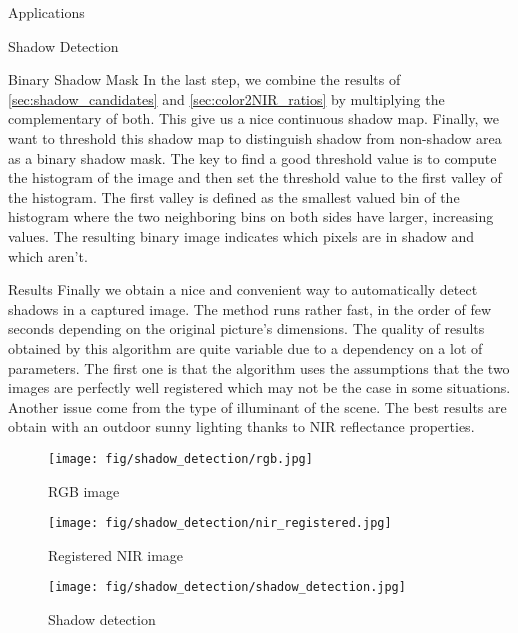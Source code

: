 \documentclass[11pt]{article}
\begin{document}
\begin{section}{Applications}
\begin{subsection}{Shadow Detection}
        \begin{subsubsection}{Binary Shadow Mask}
            \label{sec:binary_shadow_mask}
            In the last step, we combine the results of \ref{sec:shadow_candidates} and \ref{sec:color2NIR_ratios} by multiplying the complementary of both. This give us a nice continuous shadow map. Finally, we want to threshold this shadow map to distinguish shadow from non-shadow area as a binary shadow mask. The key to find a good threshold value is to compute the histogram of the image and then set the threshold value to the first valley of the histogram. The first valley is defined as the smallest valued bin of the histogram where the two neighboring bins on both sides have larger, increasing values. The resulting binary image indicates which pixels are in shadow and which aren't.

        \end{subsubsection}

        \begin{subsubsection}{Results}
            \label{sec:shadow_results}
            Finally we obtain  a nice and convenient way to automatically detect shadows in a captured image. The method runs rather fast, in the order of few seconds depending on the original picture's dimensions. The quality of results obtained by this algorithm are quite variable due to a dependency on a lot of parameters. The first one is that the algorithm uses the assumptions that the two images are perfectly well registered which may not be the case in some situations. Another issue come from the type of illuminant of the scene. The best results are obtain with an outdoor sunny lighting thanks to NIR reflectance properties.

            \begin{figure}[!h]
                \centering
                \begin{minipage}[b]{0.35\textwidth}
                    \texttt{[image: fig/shadow\_detection/rgb.jpg]}
                    \caption{RGB image}
                \end{minipage} \hspace{0.5em} %
                \begin{minipage}[b]{0.35\textwidth}
                    \texttt{[image: fig/shadow\_detection/nir\_registered.jpg]}
                    \caption{Registered NIR image}
                \end{minipage} \hspace{0.5em} %
                \begin{minipage}[b]{0.35\textwidth}
                    \texttt{[image: fig/shadow\_detection/shadow\_detection.jpg]}
                    \caption{Shadow detection}
                \end{minipage}
            \end{figure}


        \end{subsubsection}

    \end{subsection}

\end{section}
\end{document}
